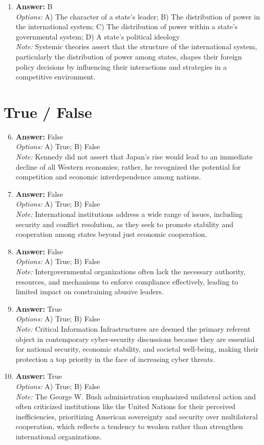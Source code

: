 \documentclass[12pt]{article}
\begin{document}
\begin{enumerate}[label=\arabic*.]
\item \textbf{Answer:} B
\\ \textit{Options:} A) The character of a state's leader; B) The distribution of power in the international system; C) The distribution of power within a state's governmental system; D) A state's political ideology
\\ \textit{Note:} Systemic theories assert that the structure of the international system, particularly the distribution of power among states, shapes their foreign policy decisions by influencing their interactions and strategies in a competitive environment.
\end{enumerate}

\section*{True / False}
\begin{enumerate}[label=\arabic*.]
\setcounter{enumi}{5}
\item \textbf{Answer:} False
\\ \textit{Options:} A) True; B) False
\\ \textit{Note:} Kennedy did not assert that Japan's rise would lead to an immediate decline of all Western economies; rather, he recognized the potential for competition and economic interdependence among nations.
\item \textbf{Answer:} False
\\ \textit{Options:} A) True; B) False
\\ \textit{Note:} International institutions address a wide range of issues, including security and conflict resolution, as they seek to promote stability and cooperation among states beyond just economic cooperation.
\item \textbf{Answer:} False
\\ \textit{Options:} A) True; B) False
\\ \textit{Note:} Intergovernmental organizations often lack the necessary authority, resources, and mechanisms to enforce compliance effectively, leading to limited impact on constraining abusive leaders.
\item \textbf{Answer:} True
\\ \textit{Options:} A) True; B) False
\\ \textit{Note:} Critical Information Infrastructures are deemed the primary referent object in contemporary cyber-security discussions because they are essential for national security, economic stability, and societal well-being, making their protection a top priority in the face of increasing cyber threats.
\item \textbf{Answer:} True
\\ \textit{Options:} A) True; B) False
\\ \textit{Note:} The George W. Bush administration emphasized unilateral action and often criticized institutions like the United Nations for their perceived inefficiencies, prioritizing American sovereignty and security over multilateral cooperation, which reflects a tendency to weaken rather than strengthen international organizations.
\end{enumerate}
\end{document}
